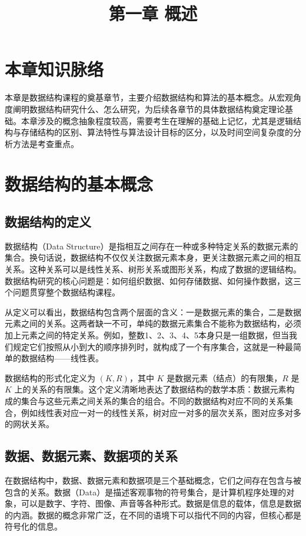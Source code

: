 \documentclass[12pt, a4paper]{article}
\title{\textbf{第一章 概述}}
\author{}
\date{}
\begin{document}
\maketitle

\section*{本章知识脉络}

本章是数据结构课程的奠基章节，主要介绍数据结构和算法的基本概念。从宏观角度阐明数据结构研究什么、怎么研究，为后续各章节的具体数据结构奠定理论基础。本章涉及的概念抽象程度较高，需要考生在理解的基础上记忆，尤其是逻辑结构与存储结构的区别、算法特性与算法设计目标的区分，以及时间空间复杂度的分析方法是考查重点。

\section{数据结构的基本概念}

\subsection{数据结构的定义}

数据结构（Data Structure）是指相互之间存在一种或多种特定关系的数据元素的集合。换句话说，数据结构不仅仅关注数据元素本身，更关注数据元素之间的相互关系。这种关系可以是线性关系、树形关系或图形关系，构成了数据的逻辑结构。数据结构研究的核心问题是：如何组织数据、如何存储数据、如何操作数据，这三个问题贯穿整个数据结构课程。

从定义可以看出，数据结构包含两个层面的含义：一是数据元素的集合，二是数据元素之间的关系。这两者缺一不可，单纯的数据元素集合不能称为数据结构，必须加上元素之间的特定关系。例如，整数1、2、3、4、5本身只是一组数据，但当我们规定它们按照从小到大的顺序排列时，就构成了一个有序集合，这就是一种最简单的数据结构——线性表。

数据结构的形式化定义为 $(K, R)$，其中 $K$ 是数据元素（结点）的有限集，$R$ 是 $K$ 上的关系的有限集。这个定义清晰地表达了数据结构的数学本质：数据元素构成的集合与这些元素之间关系的集合的组合。不同的数据结构对应不同的关系集合，例如线性表对应一对一的线性关系，树对应一对多的层次关系，图对应多对多的网状关系。

\subsection{数据、数据元素、数据项的关系}

在数据结构中，数据、数据元素和数据项是三个基础概念，它们之间存在包含与被包含的关系。数据（Data）是描述客观事物的符号集合，是计算机程序处理的对象，可以是数字、字符、图像、声音等各种形式。数据是信息的载体，信息是数据的内涵。数据的概念非常广泛，在不同的语境下可以指代不同的内容，但核心都是符号化的信息。
\end{document}

